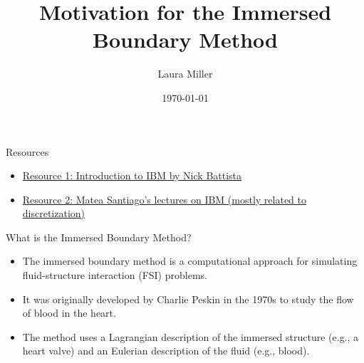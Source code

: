 \documentclass{beamer}
\title{Motivation for the Immersed Boundary Method}
\author{Laura Miller}
\date{\today}
\begin{document}
\frame{\titlepage}

\begin{frame}{Resources}
  \begin{itemize}
    \item \href{https://www.youtube.com/watch?v=PJyQA0vwbgU}{Resource 1: Introduction to IBM by Nick Battista}
    \item \href{https://drive.google.com/drive/folders/1G2bkEsv2Jz_R7165a5BqPbW4dU2hXBHb?usp=sharing}{Resource 2: Matea Santiago's lectures on IBM (mostly related to discretization)}
  \end{itemize}
\end{frame}

\begin{frame}{What is the Immersed Boundary Method?}
    \begin{itemize}
        \item The immersed boundary method is a computational approach for simulating fluid-structure interaction (FSI) problems.
        \item It was originally developed by Charlie Peskin in the 1970s to study the flow of blood in the heart.
        \item The method uses a Lagrangian description of the immersed structure (e.g., a heart valve) and an Eulerian description of the fluid (e.g., blood).
    \end{itemize}
\end{frame}
\end{document}
